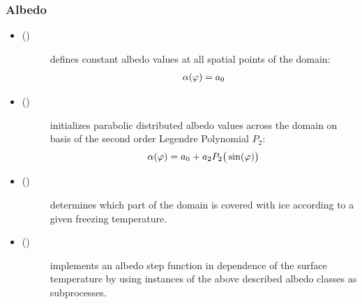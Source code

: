 \documentclass[a4paper,10pt,english]{sphinxmanual}
\begin{document}
\subsubsection{Albedo}
\label{models:albedo}\begin{itemize}
\item {} \begin{description}
\item[{{\hyperref[api/climlab.surface:climlab.surface.albedo.ConstantAlbedo]{\emph{}}} ()}] \leavevmode
defines constant albedo values at all spatial points of the domain:
\begin{gather}
\begin{split}\alpha(\varphi) = a_0\end{split}\notag
\end{gather}
\end{description}

\item {} \begin{description}
\item[{{\hyperref[api/climlab.surface:climlab.surface.albedo.P2Albedo]{\emph{}}} ()}] \leavevmode
initializes parabolic distributed albedo values across the domain on basis of the second order Legendre Polynomial \(P_2\):
\begin{gather}
\begin{split}\alpha(\varphi) = a_0 + a_2 P_2 \big(\sin (\varphi) \big)\end{split}\notag
\end{gather}
\end{description}

\item {} \begin{description}
\item[{{\hyperref[api/climlab.surface:climlab.surface.albedo.Iceline]{\emph{}}} ()}] \leavevmode
determines which part of the domain is covered with ice according to a given freezing temperature.

\end{description}

\item {} \begin{description}
\item[{{\hyperref[api/climlab.surface:climlab.surface.albedo.StepFunctionAlbedo]{\emph{}}} ()}] \leavevmode
implements an albedo step function in dependence of the surface temperature by using instances of the above described albedo classes as subprocesses.

\end{description}

\end{itemize}
\end{document}
